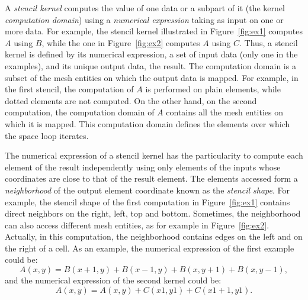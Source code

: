 
A \emph{stencil kernel} computes the value of one data or a subpart of it (the kernel \emph{computation domain}) using a \emph{numerical expression} taking as input on one or more data.
For example, the stencil kernel illustrated in Figure~\ref{fig:ex1} computes $A$ using $B$, while the one in Figure~\ref{fig:ex2} computes $A$ using $C$. Thus, a stencil kernel is defined by its numerical expression, a set of input data (only one in the examples), and its unique output data, the result. 
The computation domain is a subset of the mesh entities on which the output data is mapped. For example, in the first stencil, the computation of $A$ is performed on plain elements, while dotted elements are not computed. On the other hand, on the second computation, the computation domain of $A$ contains all the mesh entities on which it is mapped. This computation domain defines the elements over which the space loop iterates.

The numerical expression of a stencil kernel has the particularity to compute each element of the result independently using only elements of the inputs whose coordinates are close to that of the result element.
The elements accessed form a \emph{neighborhood} of the output element coordinate known as the \emph{stencil shape}. For example, the stencil shape of the first computation in Figure~\ref{fig:ex1} contains direct neighbors on the right, left, top and bottom. Sometimes, the neighborhood can also access different mesh entities, as for example in Figure~\ref{fig:ex2}. Actually, in this computation, the neighborhood contains edges on the left and on the right of a cell. As an example, the numerical expression of the first example could be:
\begin{equation*} 
A(x,y) = B(x+1,y)+B(x-1,y)+B(x,y+1)+B(x,y-1),
\end{equation*}
and the numerical expression of the second kernel could be:
\begin{equation*} 
A(x,y) = A(x,y)+C(x1,y1)+C(x1+1,y1).
\end{equation*}

